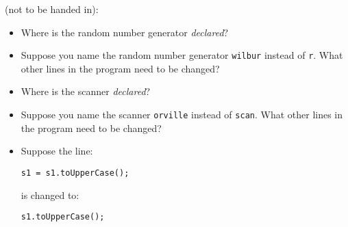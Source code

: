 (not to be handed in):
\begin{itemize}
\item Where is the random number generator {\em declared}?
\item Suppose you name the random number generator {\tt wilbur} instead of {\tt r}.
What other lines in the program need to be changed?
\item Where is the scanner {\em declared}?
\item Suppose you name the scanner {\tt orville} instead of {\tt scan}.
What other lines in the program need to be changed?
\item
Suppose the line:

\vspace*{-.2in}
\begin{center}
\verb$s1 = s1.toUpperCase();$
\end{center}
\vspace*{-.2in}

is changed to:

\vspace*{-.2in}
\begin{center}
\verb$s1.toUpperCase();$
\end{center}


\end{itemize}
